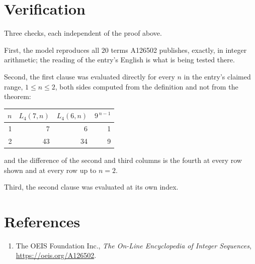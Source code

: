 \documentclass[11pt,a4paper]{article}
\theoremstyle{plain}
\theoremstyle{definition}
\begin{document}
\section{Verification}

Three checks, each independent of the proof above.

First, the model reproduces all $20$ terms A126502 publishes, exactly, in integer
arithmetic; the reading of the entry's English is what is being tested there.

Second, the first clause was evaluated directly for every $n$ in the entry's claimed range,
$1\le n\le2$, both sides computed from the definition and not from the theorem:

\begin{center}
\begin{tabular}{rrrr}
$n$ & $L_{4}(7,n)$ & $L_{4}(6,n)$ & $9^{\,n-1}$ \\ \hline
1 & 7 & 6 & 1 \\
2 & 43 & 34 & 9 \\
\end{tabular}
\end{center}

\noindent and the difference of the second and third columns is the fourth at every row shown
and at every row up to $n=2$.

Third, the second clause was evaluated at its own index.

\section*{References}
\begin{enumerate}
\item The OEIS Foundation Inc., \emph{The On-Line Encyclopedia of Integer Sequences},
\url{https://oeis.org/A126502}.
\end{enumerate}
\end{document}
